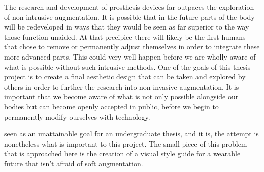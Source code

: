 The research and development of prosthesis devices far outpaces the exploration of non intrusive augmentation. It is possible that in the future parts of the body will be redeveloped in ways that they would be seen as far superior to the way those function unaided. At that precipice there will likely be the first humans that chose to remove or permanently adjust themselves in order to integrate these more advanced parts. This could very well happen before we are wholly aware of what is possible without such intrusive methods. One of the goals of this thesis project is to create a final aesthetic design that can be taken and explored by others in order to further the research into non invasive augmentation. It is important that we become aware of what is not only possible alongside our bodies but can become openly accepted in public, before we begin to permanently modify ourselves with technology. 

 seen as an unattainable goal for an undergraduate thesis, and it is, the attempt is nonetheless what is important to this project. The small piece of this problem that is approached here is the creation of a visual style guide for a wearable future that isn't afraid of soft augmentation.

